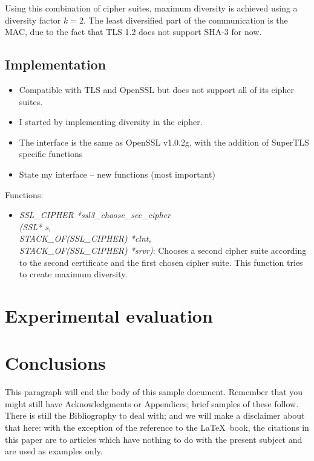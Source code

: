 \documentclass{sig-alternate-05-2015}
\begin{document}
Using this combination of cipher suites, maximum diversity is achieved using a diversity factor $k = 2$. The least diversified part of the communication is the MAC, due to the fact that TLS 1.2 does not support SHA-3 for now.

\subsection{Implementation}

\begin{itemize}
\item Compatible with TLS and OpenSSL but does not support all of its cipher suites.
\item I started by implementing diversity in the cipher.
\item The interface is the same as OpenSSL v1.0.2g, with the addition of SuperTLS specific functions
\item State my interface -- new functions (most important)
\end{itemize}

Functions:
\begin{itemize}
	\item{\textit{SSL\_CIPHER *ssl3\_choose\_sec\_cipher \\(SSL* s,\\ STACK\_OF(SSL\_CIPHER) *clnt,\\ STACK\_OF(SSL\_CIPHER) *srvr)}: Chooses a second cipher suite according to the second certificate and the first chosen cipher suite. This function tries to create maximum diversity.}
\end{itemize}

\section{Experimental evaluation}

\section{Conclusions}
This paragraph will end the body of this sample document.
Remember that you might still have Acknowledgments or
Appendices; brief samples of these
follow.  There is still the Bibliography to deal with; and
we will make a disclaimer about that here: with the exception
of the reference to the \LaTeX\ book, the citations in
this paper are to articles which have nothing to
do with the present subject and are used as
examples only.
\end{document}
